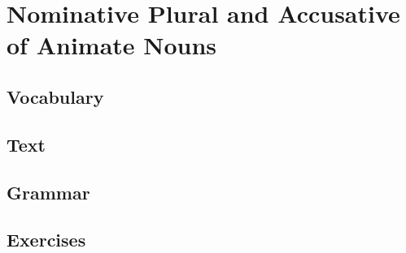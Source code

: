 \chapter{Nominative Plural and Accusative of Animate Nouns}
\section*{Vocabulary}
\section*{Text}
\section*{Grammar}
\section*{Exercises}
